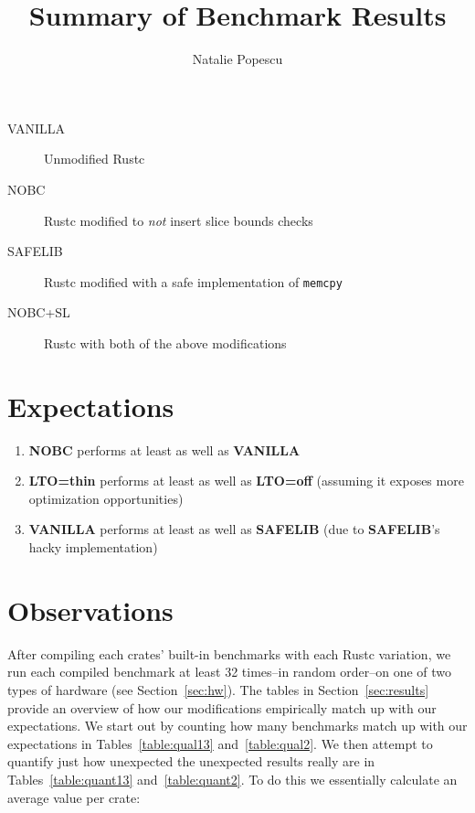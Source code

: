 \documentclass{article}
\begin{document}
\title{Summary of Benchmark Results}
\date{}
\author{Natalie Popescu}
\maketitle


\begin{description}

\item[VANILLA] Unmodified Rustc

\item[NOBC] Rustc modified to \textit{not} insert slice bounds checks

\item[SAFELIB] Rustc modified with a safe implementation of \texttt{memcpy}

\item[NOBC+SL] Rustc with both of the above modifications

\end{description}


\section{Expectations}


\begin{enumerate}

\item \textbf{NOBC} performs at least as well as \textbf{VANILLA}

\item \textbf{LTO=thin} performs at least as well as \textbf{LTO=off} (assuming it exposes more optimization opportunities)

\item \textbf{VANILLA} performs at least as well as \textbf{SAFELIB}  (due to \textbf{SAFELIB}'s hacky implementation)

\end{enumerate}


\section{Observations}


After compiling each crates' built-in benchmarks with each Rustc variation, we run each compiled benchmark at least 32 times\---in random order\---on one of two types of hardware (see Section~\ref{sec:hw}). 
%
The tables in Section~\ref{sec:results} provide an overview of how our modifications empirically match up with our expectations. 
%
We start out by counting how many benchmarks match up with our expectations in Tables~\ref{table:qual13} and~\ref{table:qual2}. 
%
We then attempt to quantify just how unexpected the unexpected results really are in Tables~\ref{table:quant13} and~\ref{table:quant2}.
%
To do this we essentially calculate an average value per crate: 
\end{document}
